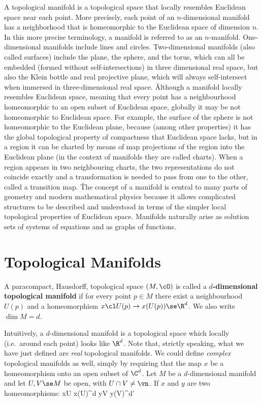 A topological manifold is a topological space that locally resembles Euclidean space near each point. More precisely,
each point of an $n$-dimensional manifold has a neighborhood that is homeomorphic to the Euclidean space of dimension
$n$. In this more precise terminology, a manifold is referred to as an $n$-manifold. One-dimensional manifolds
include lines and circles. Two-dimensional manifolds (also called surfaces) include the plane, the sphere, and the
torus, which can all be embedded (formed without self-intersections) in three dimensional real space, but also the
Klein bottle and real projective plane, which will always self-intersect when immersed in three-dimensional real
space. \v

Although a manifold locally resembles Euclidean space, meaning that every point has a neighbourhood homeomorphic to
an open subset of Euclidean space, globally it may be not homeomorphic to Euclidean space. For example, the surface
of the sphere is not homeomorphic to the Euclidean plane, because (among other properties) it has the global
topological property of compactness that Euclidean space lacks, but in a region it can be charted by means of map
projections of the region into the Euclidean plane (in the context of manifolds they are called charts). When a
region appears in two neighbouring charts, the two representations do not coincide exactly and a transformation is
needed to pass from one to the other, called a transition map. \v

The concept of a manifold is central to many parts of geometry and modern mathematical physics because it allows
complicated structures to be described and understood in terms of the simpler local topological properties of
Euclidean space. Manifolds naturally arise as solution sets of systems of equations and as graphs of functions.


\section{Topological Manifolds}

A paracompact, Hausdorff, topological space $(M,\cO)$ is called a \textbf{$d$-dimensional topological manifold} if
for every point $p\in M$ there exist a neighbourhood $U(p)$ and a homeomorphism $x\cl U(p) \to x(U(p)) \se \R^d$. We
also write $\dim M = d$. \ed

Intuitively, a $d$-dimensional manifold is a topological space which locally (i.e.\ around each point) looks like
$\R^d$. Note that, strictly speaking, what we have just defined are \emph{real} topological manifolds. We could
define \emph{complex} topological manifolds as well, simply by requiring that the map $x$ be a homeomorphism onto an
open subset of $\C^d$.
\bt[]
Let $M$ be a $d$-dimensional manifold and let $U,V\se M$ be open, with $U\cap V \neq \vn$. If $x$ and $y$ are two
homeomorphisms:
\bse
x\cl U \to x(U)\se \R^d \qquad {}\qquad y\cl V \to y(V)\se\R^{d'}
\ese

